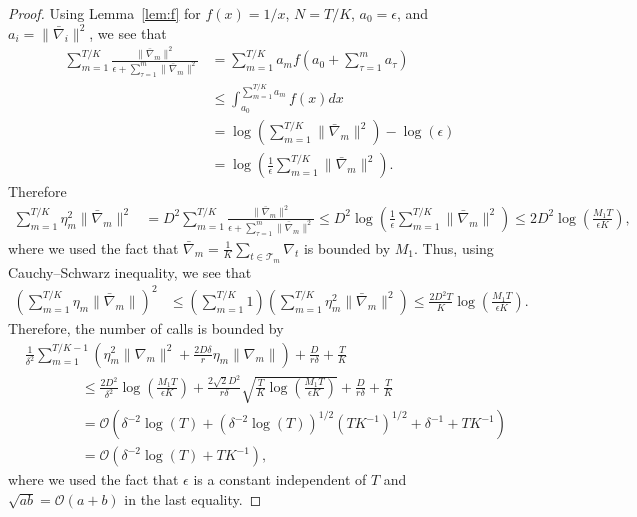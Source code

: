 \documentclass[twoside,11pt,]{article}
\newcommand{\C}[1]{\mathcal{#1}}
\newcommand{\bn}{\bar{\nabla}}
\begin{document}
\begin{proof}
Using Lemma~\ref{lem:f} for $f(x) = 1/x$, $N = T/K$, $a_0 = \epsilon$, and $a_i = \| \bn_i \|^2$, we see that
\begin{align*}
\sum_{m = 1}^{T/K} \frac{\| \bn_m \|^2}{\epsilon + \sum_{\tau=1}^{m}\| \bn_m \|^2} 
&= \sum_{m = 1}^{T/K} a_m f\left( a_0 + \sum_{\tau=1}^{m} a_\tau \right) \\
&\leq \int_{a_0}^{\sum_{m = 1}^{T/K} a_m} f(x) dx \\
&= \log\left( \sum_{m = 1}^{T/K} \| \bn_m \|^2 \right) - \log(\epsilon) \\
&= \log\left( \frac{1}{\epsilon} \sum_{m = 1}^{T/K} \| \bn_m \|^2 \right).
\end{align*}
Therefore
\begin{align*}
\sum_{m = 1}^{T/K} \eta_m^2 \| \bn_m \|^2 
&= D^2 \sum_{m = 1}^{T/K} \frac{\| \bn_m \|^2}{\epsilon + \sum_{\tau=1}^{m}\| \bn_m \|^2} 
\leq D^2\log\left( \frac{1}{\epsilon} \sum_{m = 1}^{T/K} \| \bn_m \|^2 \right) 
\leq 2D^2\log\left( \frac{M_1 T}{\epsilon K} \right),
\end{align*}
where we used the fact that $\bn_m=\frac{1}{K}\sum_{t\in\C{T}_m}\nabla_t$ is bounded by $M_1$.
Thus, using Cauchy–Schwarz inequality, we see that
\begin{align*}
\left( \sum_{m = 1}^{T/K} \eta_m \| \bn_m \| \right)^2
&\leq 
\left( \sum_{m = 1}^{T/K} 1 \right)
\left( \sum_{m = 1}^{T/K} \eta_m^2 \| \bn_m \|^2 \right) 
\leq \frac{2D^2T}{K} \log\left( \frac{M_1 T}{\epsilon K} \right).
\end{align*}
Therefore, the number of calls is bounded by
\begin{align*}
&\frac{1}{\delta^2} \sum_{m = 1}^{T/K - 1} \left( \eta_m^2 \| \nabla_m \|^2 + \frac{2 D \delta}{r} \eta_m \| \nabla_m \| \right)
+ \frac{D}{r \delta} 
+ \frac{T}{K} \\
&\qquad\qquad\leq \frac{2D^2}{\delta^2} \log\left( \frac{M_1 T}{\epsilon K} \right)
+ \frac{2 \sqrt{2} D^2}{r \delta} \sqrt{\frac{T}{K} \log\left( \frac{M_1 T}{\epsilon K} \right)}
+ \frac{D}{r \delta} 
+ \frac{T}{K} \\
&\qquad\qquad= \C{O}\left( \delta^{-2} \log(T) 
+ (\delta^{-2} \log(T))^{1/2} (T K^{-1})^{1/2}
+ \delta^{-1}
+ T K^{-1} \right) \\
&\qquad\qquad= \C{O}\left( \delta^{-2} \log(T) 
+ T K^{-1} \right),
\end{align*}
where we used the fact that $\epsilon$ is a constant independent of $T$ and $\sqrt{a b} = \C{O}(a + b)$ in the last equality.
\end{proof}
\end{document}
